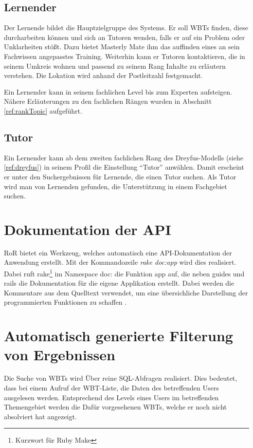 \subsection{Lernender}
Der Lernende bildet die Hauptzielgruppe des Systems. Er soll WBTs finden, diese
durcharbeiten können und sich an Tutoren wenden, falls er auf ein Problem oder
Unklarheiten stößt. Dazu bietet Masterly Mate ihm das auffinden eines an sein
Fachwissen angepasstes Training. Weiterhin kann er Tutoren kontaktieren, die in
seinem Umkreis wohnen und passend zu seinem Rang Inhalte zu erläutern verstehen.
Die Lokation wird anhand der Postleitzahl festgemacht.

Ein Lernender kann in seinem fachlichen Level bis zum Experten aufsteigen.
Nähere Erläuterungen zu den fachlichen Rängen wurden in Abschnitt
\ref{ref:rankTopic} aufgeführt.

\subsection{Tutor}
Ein Lernender kann ab dem zweiten fachlichen Rang des Dreyfus-Modells (siehe
\ref{ref:dreyfus}) in seinem Profil die Einstellung "`Tutor"' anwählen. Damit
erscheint er unter den Suchergebnissen für Lernende, die einen Tutor suchen. Als
Tutor wird man von Lernenden gefunden, die Unterstützung in einem Fachgebiet
suchen.

\section{Dokumentation der API}\label{ref:archDoc}
RoR bietet ein Werkzeug, welches automatisch eine API-Dokumentation der
Anwendung erstellt. Mit der Kommandozeile \textit{rake doc:app} wird dies
realisiert. Dabei ruft rake\footnote{Kurzwort für Ruby Make} im Namespace doc:
die Funktion app auf, die neben guides und rails die Dokumentation für die
eigene Applikation erstellt. Dabei werden die Kommentare
aus dem Quelltext verwendet, um eine übersichliche Darstellung der
programmierten Funktionen zu schaffen \cite{edgeGuide:2013}.

\section{Automatisch generierte Filterung von Ergebnissen}\label{ref:autoResult}
Die Suche von WBTs wird Über reine SQL-Abfragen realisiert.
Dies bedeutet, dass bei einem Aufruf der WBT-Liste, die Daten des betreffenden
Users ausgelesen werden. Entsprechend des Levels eines Users im betreffenden
Themengebiet werden die Dafür vorgesehenen WBTs, welche er noch nicht
absolviert hat angezeigt.

